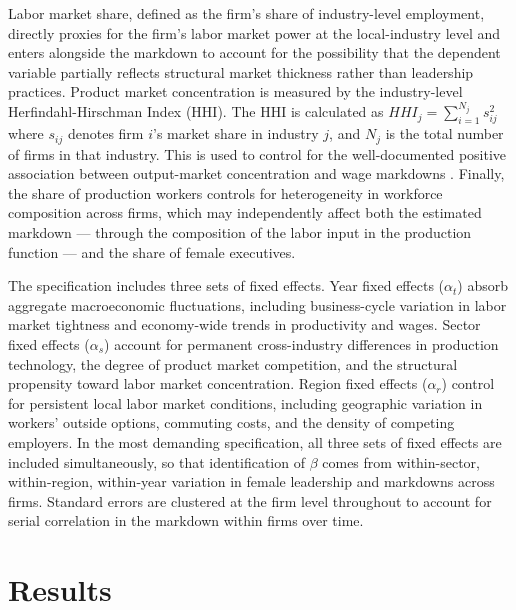 \documentclass[12pt]{article}
\begin{document}
Labor market share, defined as the firm's share of industry-level employment, directly proxies for the firm's labor market power at the local-industry level and enters alongside the markdown to account for the possibility that the dependent variable partially reflects structural market thickness rather than leadership practices.  Product market concentration is measured by the industry-level Herfindahl-Hirschman Index (HHI). The HHI is calculated as $HHI_{j}=\sum_{i=1}^{N_j} s_{ij}^2$ where $s_{ij}$ denotes firm $i$'s market share in industry $j$, and $N_j$ is the total number of firms in that industry. This is used to control for the well-documented positive association between output-market concentration and wage markdowns \parencite{berger_labor_2022}. Finally, the share of production workers controls for heterogeneity in workforce composition across firms, which may independently affect both the estimated markdown — through the composition of the labor input in the production function — and the share of female executives.

The specification includes three sets of fixed effects. Year fixed effects ($\alpha_t$) absorb aggregate macroeconomic fluctuations, including business-cycle variation in labor market tightness and economy-wide trends in productivity and wages. Sector fixed effects ($\alpha_s$) account for permanent cross-industry differences in production technology, the degree of product market competition, and the structural propensity toward labor market concentration. Region fixed effects ($\alpha_r$) control for persistent local labor market conditions, including geographic variation in workers' outside options, commuting costs, and the density of competing employers. In the most demanding specification, all three sets of fixed effects are included simultaneously, so that identification of $\beta$ comes from within-sector, within-region, within-year variation in female leadership and markdowns across firms. Standard errors are clustered at the firm level throughout to account for serial correlation in the markdown within firms over time.

\section{Results}\label{sec:results}
\end{document}
